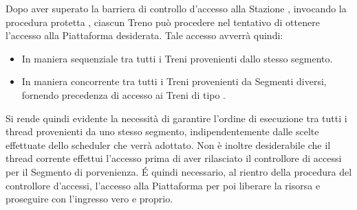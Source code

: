\begin{description}
		Dopo aver superato la barriera di controllo d'accesso alla Stazione , invocando la procedura protetta , ciascun Treno può procedere nel tentativo di ottenere l'accesso alla Piattaforma desiderata. Tale accesso avverrà quindi:
		
		\begin{itemize}
			\item In maniera sequenziale tra tutti i Treni provenienti dallo stesso segmento.
			\item In maniera concorrente tra tutti i Treni provenienti da Segmenti diversi, fornendo precedenza di accesso ai Treni di tipo .
		\end{itemize}
		
		Si rende quindi evidente la necessità di garantire l'ordine di esecuzione tra tutti i thread provenienti da uno stesso segmento, indipendentemente dalle scelte effettuate dello scheduler che verrà adottato. Non è inoltre desiderabile che il thread corrente effettui l'accesso prima di aver rilasciato il controllore di accessi per il Segmento di porvenienza. \'E quindi necessario, al rientro della procedura  del controllore d'accessi,  l'accesso alla Piattaforma per poi liberare la risorsa  e proseguire con l'ingresso vero e proprio.
				  

\end{description}
